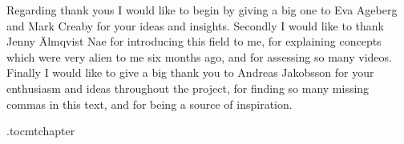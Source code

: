 Regarding thank yous I would like to begin by giving a big one to Eva Ageberg and Mark Creaby for your ideas and insights. Secondly I would like to thank Jenny Älmqvist Nae for introducing this field to me, for explaining concepts which were very alien to me six months ago, and for assessing so many videos. Finally I would like to give a big thank you to Andreas Jakobsson for your enthusiasm and ideas throughout the project, for finding so many missing commas in this text, and for being a source of inspiration.


\newpage
\etocdepthtag.toc{mtchapter}
\thispagestyle{plain}
\printglossary
